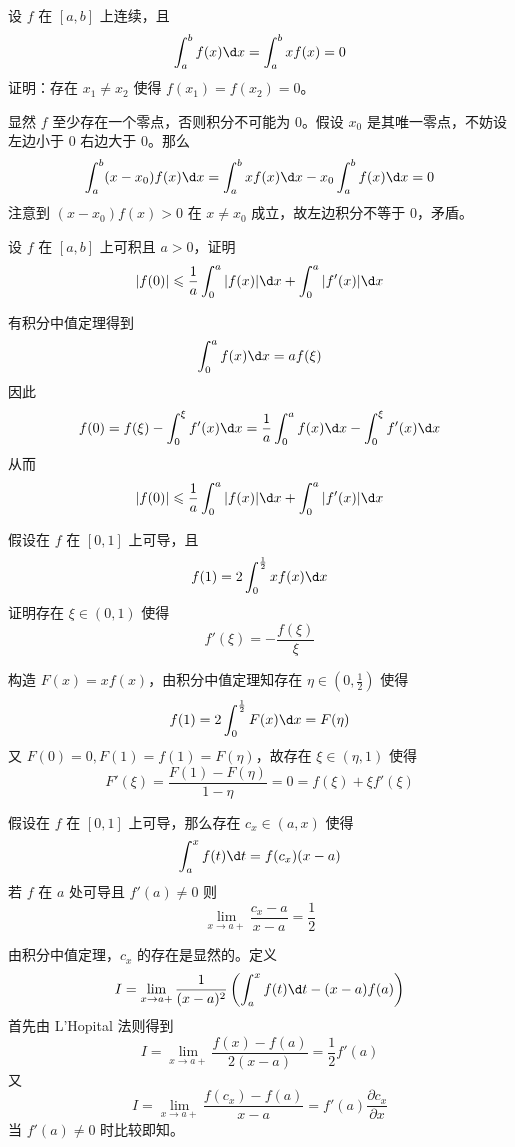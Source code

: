 \begin{problem}[000045]
设 $f$ 在 $[a, b]$ 上连续，且
\[ \int_{a}^{b} f(x) \d x = \int_{a}^{b} x f(x) = 0 \]
证明：存在 $x_1 \neq x_2$ 使得 $f(x_1) = f(x_2) = 0$。
\end{problem}

\begin{solution}
	显然 $f$ 至少存在一个零点，否则积分不可能为 $0$。假设 $x_0$ 是其唯一零点，不妨设左边小于 $0$ 右边大于 $0$。那么
	\[ \int_{a}^{b} (x - x_0) f(x) \d x = \int_{a}^{b} x f(x) \d x - x_0 \int_{a}^{b} f(x) \d x = 0 \]
	注意到 $(x - x_0) f(x) > 0$ 在 $x \neq x_0$ 成立，故左边积分不等于 $0$，矛盾。
\end{solution}

\begin{problem}[000046]
设 $f$ 在 $[a, b]$ 上可积且 $a > 0$，证明
\[ |f(0)| \leqslant \frac{1}{a} \int_{0}^{a} |f(x)| \d x + \int_{0}^{a} |f'(x)| \d x \]
\end{problem}

\begin{solution}
	有积分中值定理得到
	\[ \int_{0}^{a} f(x) \d x = a f(\xi) \]
	因此
	\[ f(0) = f(\xi) - \int_{0}^{\xi} f'(x) \d x = \frac{1}{a} \int_{0}^{a} f(x) \d x - \int_{0}^{\xi} f'(x) \d x \]
	从而
	\[ |f(0)| \leqslant \frac{1}{a} \int_{0}^{a} |f(x)| \d x + \int_{0}^{a} |f'(x)| \d x \]
\end{solution}

\begin{problem}[000047]
假设在 $f$ 在 $[0, 1]$ 上可导，且
\[ f(1) = 2 \int_{0}^{\frac{1}{2}} x f(x) \d x \]
证明存在 $\xi \in (0, 1)$ 使得
\[ f'(\xi) = -\frac{f(\xi)}{\xi} \]
\end{problem}

\begin{solution}
	构造 $F(x) = x f(x)$，由积分中值定理知存在 $\eta \in (0, \frac{1}{2})$ 使得
	\[ f(1) = 2\int_{0}^{\frac{1}{2}} F(x) \d x = F(\eta) \]
	又 $F(0) = 0, F(1) = f(1) = F(\eta)$，故存在 $\xi \in (\eta, 1)$ 使得
	\[ F'(\xi) = \frac{F(1) - F(\eta)}{1 - \eta} = 0 = f(\xi) + \xi f'(\xi) \]
\end{solution}

\begin{problem}[000048]
假设在 $f$ 在 $[0, 1]$ 上可导，那么存在 $c_x \in (a, x)$ 使得
\[ \int_{a}^{x} f(t) \d t = f(c_x) (x - a) \]
若 $f$ 在 $a$ 处可导且 $f'(a) \neq 0$ 则
\[ \lim_{x \to a+} \frac{c_x - a}{x -a} = \frac{1}{2} \]
\end{problem}

\begin{solution}
	由积分中值定理，$c_x$ 的存在是显然的。定义
	\[ I = \lim_{x \to a+} \frac{1}{(x-a)^2} \left( \int_{a}^{x} f(t) \d t - (x - a) f(a) \right) \]
	首先由 L'Hopital 法则得到
	\[ I = \lim_{x \to a+} \frac{f(x) - f(a)}{2(x - a)} = \frac{1}{2} f'(a) \]
	又
	\[ I = \lim_{x \to a+}\frac{f(c_x) - f(a)}{x - a} = f'(a) \frac{\partial c_x}{\partial x} \]
	当 $f'(a) \neq 0$ 时比较即知。
\end{solution}

